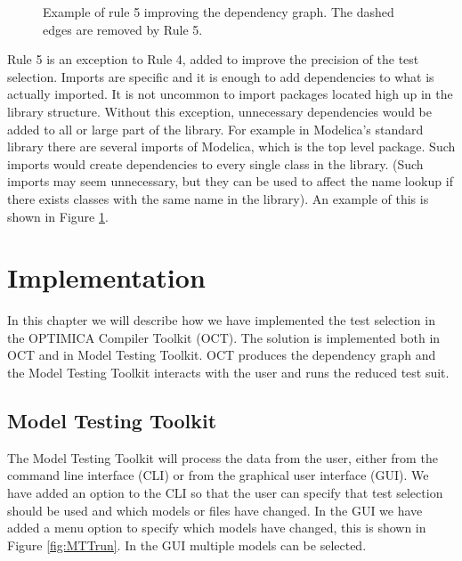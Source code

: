 \documentclass{cslthse-msc}
\begin{document}
\begin{figure}[!htbp]
    \centering
    \qquad
    \subfloat{\raisebox{4.0 cm}{}}
    \caption{Example of rule 5 improving the dependency graph. The dashed edges are removed by Rule 5.}
    \label{fig:rule5}
\end{figure}

Rule 5 is an exception to Rule 4, added to improve the precision of the test selection. Imports are specific and it is enough to add dependencies to what is actually imported. It is not uncommon to import packages located high up in the library structure. Without this exception, unnecessary dependencies would be added to all or large part of the library. For example in Modelica's standard library there are several imports of Modelica, which is the top level package. Such imports would create dependencies to every single class in the library. (Such imports may seem unnecessary, but they can be used to affect the name lookup if there exists classes with the same name in the library). An example of this is shown in Figure \ref{fig:rule5}.

\chapter[Implementation]{Implementation}
In this chapter we will describe how we have implemented the test selection in the OPTIMICA Compiler Toolkit (OCT). The solution is implemented both in OCT and in Model Testing Toolkit. OCT produces the dependency graph and the Model Testing Toolkit interacts with the user and runs the reduced test suit.

\section{Model Testing Toolkit}

The Model Testing Toolkit will process the data from the user, either from the command line interface (CLI) or from the graphical user interface (GUI). We have added an option to the CLI so that the user can specify that test selection should be used and which models or files have changed. In the GUI we have added a menu option to specify which models have changed, this is shown in Figure \ref{fig:MTTrun}. In the GUI multiple models can be selected.
\end{document}
